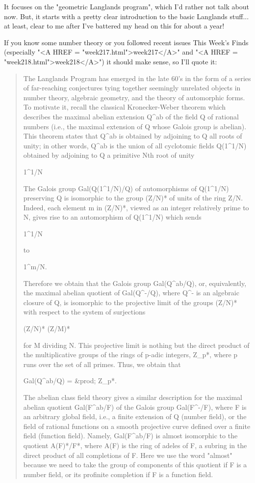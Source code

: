It focuses on the "geometric Langlands program", which I'd rather 
not talk about now.  But, it starts with a pretty clear introduction 
to the basic Langlands stuff... at least, clear to me after I've 
battered my head on this for about a year!  

If you know some number theory or you followed recent issues
This Week's Finds (especially "<A HREF = "week217.html">week217</A>"
and "<A HREF = "week218.html">week218</A>") it should 
make sense, so I'll quote it:

\begin{quote}
  The Langlands Program has emerged in the late 60's in the form of 
  a series of far-reaching conjectures tying together seemingly 
  unrelated objects in number theory, algebraic geometry, and the 
  theory of automorphic forms.  To motivate it, recall the classical 
  Kronecker-Weber theorem which describes the maximal abelian extension 
  Q^{ab} of the field Q of rational numbers (i.e., the maximal extension 
  of Q whose Galois group is abelian).  This theorem states that Q^{ab}
  is obtained by adjoining to Q all roots of unity; in other words, 
  Q^{ab} is the union of all cyclotomic fields Q(1^{1/N}) 
  obtained by adjoining to Q a primitive Nth root of unity 

  1^{1/N}

  The Galois group Gal(Q(1^{1/N})/Q) of automorphisms of 
  Q(1^{1/N}) 
  preserving Q is isomorphic to the group (Z/N)* of units of the 
  ring Z/N.  Indeed, each element m in (Z/N)*, viewed as an integer 
  relatively prime to N, gives rise to an automorphism of Q(1^{1/N}) 
  which sends

  1^{1/N}

  to 

  1^{m/N}.

  Therefore we obtain that the Galois group Gal(Q^{ab}/Q), or, 
  equivalently, the maximal abelian quotient of Gal(Q^{-}/Q), 
  where Q^{-} is an algebraic closure of Q, is isomorphic to the 
  projective limit of the groups (Z/N)* with respect to the system 
  of surjections

  (Z/N)* \to  (Z/M)* 

  for M dividing N. This projective limit is nothing but the direct 
  product of the multiplicative groups of the rings of p-adic 
  integers, Z_{p}*, where p runs over the set of all primes.  Thus, 
  we obtain that

  Gal(Q^{ab}/Q) = &prod; Z_{p}*.

  The abelian class field theory gives a similar description for the
  maximal abelian quotient Gal(F^{ab}/F) of the Galois group 
  Gal(F^{-}/F), 
  where F is an arbitrary global field, i.e., a finite extension of 
  Q (number field), or the field of rational functions on a smooth 
  projective curve defined over a finite field (function field).  
  Namely, Gal(F^{ab}/F) is almost isomorphic to the quotient A(F)*/F*, 
  where A(F) is the ring of adeles of F, a subring in the direct 
  product of all completions of F.  Here we use the word "almost" 
  because we need to take the group of components of this quotient 
  if F is a number field, or its profinite completion if F is a 
  function field.


\end{quote}
